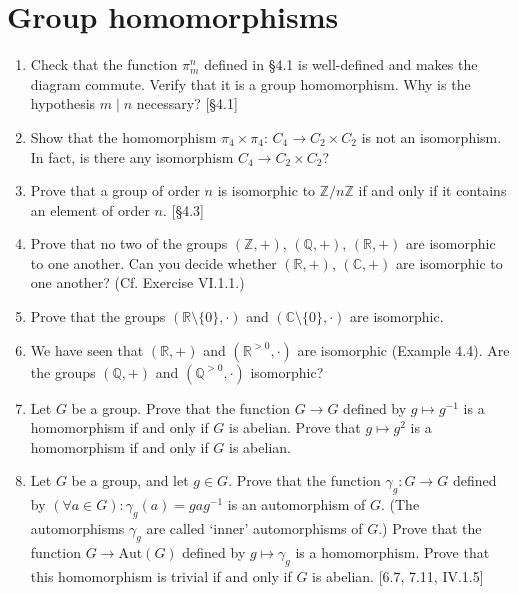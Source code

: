 \section{Group homomorphisms}
\begin{enumerate}
    \item Check that the function $\pi_m^n$ defined in \S4.1 is well-defined and makes the diagram commute. Verify that it is a group homomorphism. Why is the hypothesis $m \mid n$ necessary? [\S4.1]

    \item Show that the homomorphism $\pi_4 \times \pi_4$: $C_4 \to C_2 \times C_2$ is not an isomorphism. In fact, is there any isomorphism $C_4 \to C_2 \times C_2$?

    \item Prove that a group of order $n$ is isomorphic to $\mathbb{Z}/n\mathbb{Z}$ if and only if it contains an element of order $n$. [\S4.3]

    \item Prove that no two of the groups $(\mathbb{Z}, +)$, $(\mathbb{Q}, +)$, $(\mathbb{R}, +)$ are isomorphic to one another. Can you decide whether $(\mathbb{R}, +)$, $(\mathbb{C}, +)$ are isomorphic to one another? (Cf. Exercise VI.1.1.)

    \item Prove that the groups $(\mathbb{R} \setminus \{0\}, \cdot)$ and $(\mathbb{C} \setminus \{0\}, \cdot)$ are isomorphic.

    \item We have seen that $(\mathbb{R}, +)$ and $(\mathbb{R}^{>0}, \cdot)$ are isomorphic (Example 4.4). Are the groups $(\mathbb{Q}, +)$ and $(\mathbb{Q}^{>0}, \cdot)$ isomorphic?

    \item Let $G$ be a group. Prove that the function $G \to G$ defined by $g \mapsto g^{-1}$ is a homomorphism if and only if $G$ is abelian. Prove that $g \mapsto g^2$ is a homomorphism if and only if $G$ is abelian.

    \item Let $G$ be a group, and let $g \in G$. Prove that the function $\gamma_g: G \to G$ defined by $(\forall a \in G): \gamma_g(a) = gag^{-1}$ is an automorphism of $G$. (The automorphisms $\gamma_g$ are called `inner' automorphisms of $G$.) Prove that the function $G \to \text{Aut}(G)$ defined by $g \mapsto \gamma_g$ is a homomorphism. Prove that this homomorphism is trivial if and only if $G$ is abelian. [6.7, 7.11, IV.1.5]


\end{enumerate}
